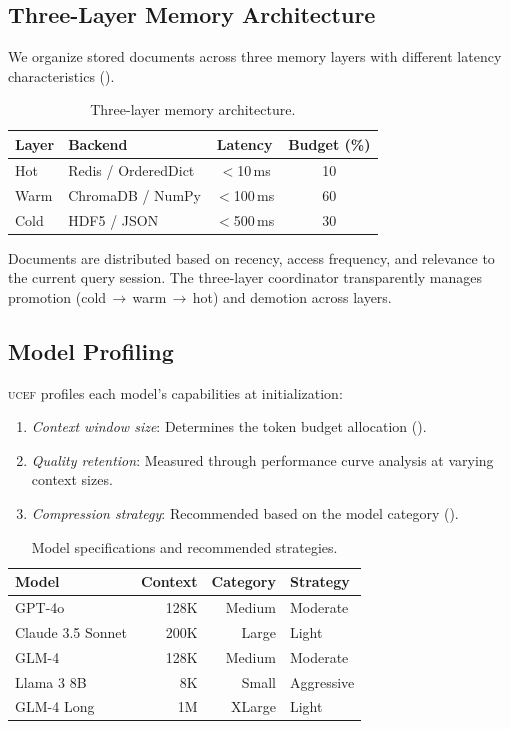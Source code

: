 \documentclass[11pt,letterpaper]{article}
\newcommand{\ucef}{\textsc{ucef}}
\begin{document}
\subsection{Three-Layer Memory Architecture}

We organize stored documents across three memory layers with different
latency characteristics ().

\begin{table}[t]
\centering
\caption{Three-layer memory architecture.}
\label{tab:memory}
\small
\begin{tabular}{@{}llcc@{}}
\toprule
Layer & Backend & Latency & Budget (\%) \\
\midrule
Hot   & Redis / OrderedDict & $<$10\,ms  & 10 \\
Warm  & ChromaDB / NumPy    & $<$100\,ms & 60 \\
Cold  & HDF5 / JSON         & $<$500\,ms & 30 \\
\bottomrule
\end{tabular}
\end{table}

Documents are distributed based on recency, access frequency, and relevance
to the current query session.  The three-layer coordinator transparently
manages promotion (cold\,$\to$\,warm\,$\to$\,hot) and demotion across
layers.

\subsection{Model Profiling}

\ucef{} profiles each model's capabilities at initialization:
\begin{enumerate}[nosep]
  \item \emph{Context window size}: Determines the token budget allocation
    ().
  \item \emph{Quality retention}: Measured through performance curve
    analysis at varying context sizes.
  \item \emph{Compression strategy}: Recommended based on the model
    category ().
\end{enumerate}

\begin{table}[t]
\centering
\caption{Model specifications and recommended strategies.}
\label{tab:models-specs}
\small
\begin{tabular}{@{}lrrl@{}}
\toprule
Model & Context & Category & Strategy \\
\midrule
GPT-4o           & 128K  & Medium & Moderate \\
Claude 3.5 Sonnet & 200K & Large  & Light \\
GLM-4            & 128K  & Medium & Moderate \\
Llama 3 8B       & 8K    & Small  & Aggressive \\
GLM-4 Long       & 1M    & XLarge & Light \\
\bottomrule
\end{tabular}
\end{table}
\end{document}
